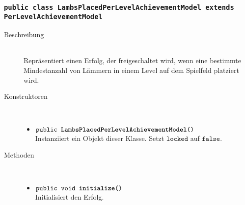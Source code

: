 		\subsubsection{\normalfont \texttt{public class \textbf{LambsPlacedPerLevelAchievementModel} extends PerLevelAchievementModel}}
		
		\begin{description}
		\item[Beschreibung] \hfill \\ Repräsentiert einen Erfolg, der freigeschaltet wird, wenn eine bestimmte Mindestanzahl von Lämmern in einem Level auf dem Spielfeld platziert wird.
			
		\item[Konstruktoren] \hfill \\
			\vspace{-.8cm}
			\begin{itemize}
				\item $\texttt{public \textbf{LambsPlacedPerLevelAchievementModel}()}$ \\ Instanziiert ein Objekt dieser Klasse. Setzt $\texttt{locked}$ auf $\texttt{false}$.
			\end{itemize}
			
		\item[Methoden] \hfill \\
			\vspace{-.8cm}
			\begin{itemize}
						\item $\texttt{public void \textbf{initialize}()}$ \\ Initialisiert den Erfolg.
				

\end{itemize}
\end{description}

